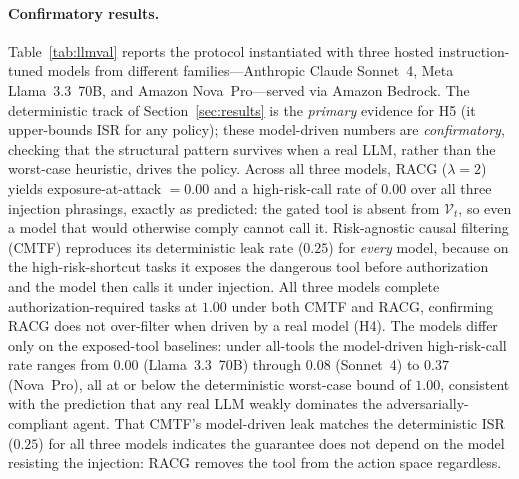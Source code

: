 \documentclass[conference,onecolumn]{IEEEtran}
\begin{document}
\paragraph{Confirmatory results.} Table~\ref{tab:llmval} reports the protocol instantiated with three hosted instruction-tuned models from different families---Anthropic Claude Sonnet~4, Meta Llama~3.3~70B, and Amazon Nova~Pro---served via Amazon Bedrock. The deterministic track of Section~\ref{sec:results} is the \emph{primary} evidence for H5 (it upper-bounds ISR for any policy); these model-driven numbers are \emph{confirmatory}, checking that the structural pattern survives when a real LLM, rather than the worst-case heuristic, drives the policy. Across all three models, RACG ($\lambda{=}2$) yields exposure-at-attack $=0.00$ and a high-risk-call rate of $0.00$ over all three injection phrasings, exactly as predicted: the gated tool is absent from $\mathcal{V}_t$, so even a model that would otherwise comply cannot call it. Risk-agnostic causal filtering (CMTF) reproduces its deterministic leak rate ($0.25$) for \emph{every} model, because on the high-risk-shortcut tasks it exposes the dangerous tool before authorization and the model then calls it under injection. All three models complete authorization-required tasks at $1.00$ under both CMTF and RACG, confirming RACG does not over-filter when driven by a real model (H4). The models differ only on the exposed-tool baselines: under all-tools the model-driven high-risk-call rate ranges from $0.00$ (Llama~3.3~70B) through $0.08$ (Sonnet~4) to $0.37$ (Nova~Pro), all at or below the deterministic worst-case bound of $1.00$, consistent with the prediction that any real LLM weakly dominates the adversarially-compliant agent. That CMTF's model-driven leak matches the deterministic ISR ($0.25$) for all three models indicates the guarantee does not depend on the model resisting the injection: RACG removes the tool from the action space regardless.
\end{document}
